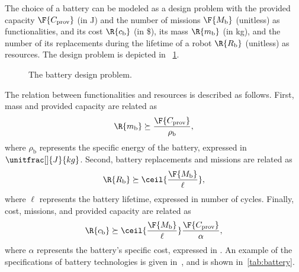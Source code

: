 \begin{example}
The choice of a battery can be modeled as a design problem with the provided capacity $\F{C_\mathrm{prov}}$ (in \unit[]{J}) and the number of missions $\F{M_\mathrm{b}}$ (unitless) as functionalities, and its cost $\R{c_\mathrm{b}}$ (in \unit[]{\$}), its mass $\R{m_\mathrm{b}}$ (in \unit[]{kg}), and the number of its replacements during the lifetime of a robot $\R{R_\mathrm{b}}$ (unitless) as resources. The design problem is depicted in
~\cref{fig:battery}. 

\begin{figure}[tbh]
\begin{center}
\end{center}
\caption{The battery design problem.\label{fig:battery}}
\end{figure}

The relation between functionalities and resources is described as follows. First, mass and provided capacity are related as
\begin{equation}
    \R{m_\mathrm{b}}\succeq \frac{\F{C_\mathrm{prov}}}{\rho_\mathrm{b}},
\end{equation}
where $\rho_\mathrm{b}$ represents the specific energy of the battery, expressed in $\unitfrac[]{J}{kg}$. Second, battery replacements and missions are related as
\begin{equation}
    \R{R_\mathrm{b}}\succeq \ceil{\frac{\F{M_\mathrm{b}}}{\ell}},
\end{equation}
where $\ell$ represents the battery lifetime, expressed in number of cycles. Finally, cost, missions, and provided capacity are related as
\begin{equation}
    \R{c_\mathrm{b}}\succeq  \ceil{\frac{\F{M_\mathrm{b}}}{\ell}} \frac{\F{C_\mathrm{prov}}}{\alpha},
\end{equation}
where $\alpha$ represents the battery's specific cost, expressed in . An example of the specifications of battery technologies is given in~\cite{censi2015}, and is shown in~\cref{tab:battery}.


\end{example}
